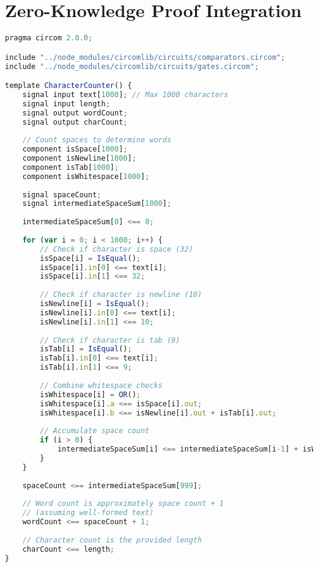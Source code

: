 \section{Zero-Knowledge Proof Integration}
\begin{lstlisting}[language=JavaScript,caption={circuits/wordcount.circom - ZK circuit for word count verification}]
pragma circom 2.0.0;

include "../node_modules/circomlib/circuits/comparators.circom";
include "../node_modules/circomlib/circuits/gates.circom";

template CharacterCounter() {
    signal input text[1000]; // Max 1000 characters
    signal input length;
    signal output wordCount;
    signal output charCount;
    
    // Count spaces to determine words
    component isSpace[1000];
    component isNewline[1000];
    component isTab[1000];
    component isWhitespace[1000];
    
    signal spaceCount;
    signal intermediateSpaceSum[1000];
    
    intermediateSpaceSum[0] <== 0;
    
    for (var i = 0; i < 1000; i++) {
        // Check if character is space (32)
        isSpace[i] = IsEqual();
        isSpace[i].in[0] <== text[i];
        isSpace[i].in[1] <== 32;
        
        // Check if character is newline (10)
        isNewline[i] = IsEqual();
        isNewline[i].in[0] <== text[i];
        isNewline[i].in[1] <== 10;
        
        // Check if character is tab (9)
        isTab[i] = IsEqual();
        isTab[i].in[0] <== text[i];
        isTab[i].in[1] <== 9;
        
        // Combine whitespace checks
        isWhitespace[i] = OR();
        isWhitespace[i].a <== isSpace[i].out;
        isWhitespace[i].b <== isNewline[i].out + isTab[i].out;
        
        // Accumulate space count
        if (i > 0) {
            intermediateSpaceSum[i] <== intermediateSpaceSum[i-1] + isWhitespace[i].out;
        }
    }
    
    spaceCount <== intermediateSpaceSum[999];
    
    // Word count is approximately space count + 1
    // (assuming well-formed text)
    wordCount <== spaceCount + 1;
    
    // Character count is the provided length
    charCount <== length;
}


\end{lstlisting}
